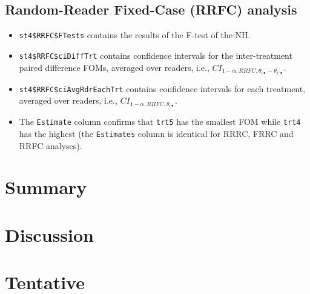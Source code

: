 \documentclass[
]{book}
\begin{document}
\hypertarget{or-applications-RRFC-dataset04-FROC-DBM}{%
\subsection{Random-Reader Fixed-Case (RRFC) analysis}\label{or-applications-RRFC-dataset04-FROC-DBM}}

\begin{itemize}
\item
  \texttt{st4\$RRFC\$FTests} contains the results of the F-test of the NH.
\item
  \texttt{st4\$RRFC\$ciDiffTrt} contains confidence intervals for the inter-treatment paired difference FOMs, averaged over readers, i.e., \(CI_{1-\alpha,RRFC,\theta_{i \bullet} - \theta_{i' \bullet}}\).
\item
  \texttt{st4\$RRFC\$ciAvgRdrEachTrt} contains confidence intervals for each treatment, averaged over readers, i.e., \(CI_{1-\alpha,RRFC,\theta_{i \bullet}}\).
\item
  The \texttt{Estimate} column confirms that \texttt{trt5} has the smallest FOM while \texttt{trt4} has the highest (the \texttt{Estimates} column is identical for RRRC, FRRC and RRFC analyses).
\end{itemize}

\hypertarget{or-applications-Summary}{%
\section{Summary}\label{or-applications-Summary}}

\hypertarget{or-applications-Discussion}{%
\section{Discussion}\label{or-applications-Discussion}}

\hypertarget{ToMullOver1-tentative}{%
\section{Tentative}\label{ToMullOver1-tentative}}
\end{document}
